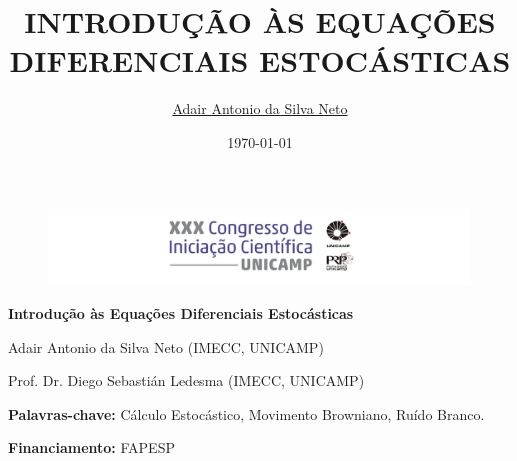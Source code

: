 \documentclass[portrait]{a0poster}	%
\author{\sffamily \href{https://github.com/adairneto}{Adair Antonio da Silva Neto}}
\title{\sffamily \uppercase{Introdução às Equações Diferenciais Estocásticas}}
\date{\sffamily \today}
\renewcommand{\Huge}{\veryHuge}
\theoremstyle{definition}
\begin{document}


\begin{figure}[h]
    \centering
      \includegraphics[width=\textwidth]{logo.png}
  \end{figure}

\begin{minipage}{\textwidth}
	\begin{minipage}{\textwidth}
        \Huge\textbf{Introdução às Equações Diferenciais Estocásticas}
    
        \par\huge Adair Antonio da Silva Neto (IMECC, UNICAMP)
        \par\huge Prof. Dr. Diego Sebastián Ledesma (IMECC, UNICAMP)
        \par\huge\textbf{Palavras-chave:} Cálculo Estocástico, Movimento Browniano, Ruído Branco.
        \par\huge\textbf{Financiamento:} FAPESP
	\end{minipage}
\end{minipage}

\vspace{1cm}

\end{document}
